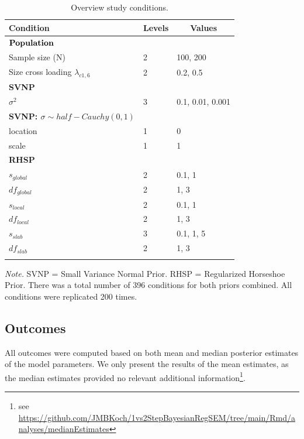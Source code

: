 \documentclass[
  man, donotrepeattitle,floatsintext]{apa6}
\begin{document}
\begin{table}[tbp]

\begin{center}
\begin{threeparttable}

\caption{\label{tab:unnamed-chunk-2}Overview study conditions.}

\begin{tabular}{lll}
\toprule
Condition & \multicolumn{1}{c}{Levels} & \multicolumn{1}{c}{Values}\\
\midrule
$\bf{Population}$ &  & \\
Sample size (N) & 2 & 100, 200\\
Size cross loading $\lambda_{c1 , 6}$ & 2 & 0.2, 0.5\\
\bf{SVNP} &  & \\
$\sigma^2$ & 3 & 0.1, 0.01, 0.001\\
\bf{SVNP}: $\sigma \sim half-Cauchy(0, 1)$ &  & \\
location & 1 & 0\\
scale & 1 & 1\\
\bf{RHSP} &  & \\
$s_{global}$ & 2 & 0.1, 1\\
$df_{global}$ & 2 & 1, 3\\
$s_{local}$ & 2 & 0.1, 1\\
$df_{local}$ & 2 & 1, 3\\
$s_{slab}$ & 3 & 0.1, 1, 5\\
$df_{slab}$ & 2 & 1, 3\\
\bottomrule
\addlinespace
\end{tabular}

\begin{tablenotes}[para]
\normalsize{\textit{Note.} SVNP = Small Variance Normal Prior. RHSP = Regularized Horseshoe Prior. There was a total number of 396 conditions for both priors combined.  All conditions were replicated 200 times.}
\end{tablenotes}

\end{threeparttable}
\end{center}

\end{table}

\subsection{Outcomes}\label{outcomes}

All outcomes were computed based on both mean and median posterior
estimates of the model parameters. We only present the results of the
mean estimates, as the median estimates provided no relevant additional
information\footnote{see
  \url{https://github.com/JMBKoch/1vs2StepBayesianRegSEM/tree/main/Rmd/analyses/medianEstimates}}.
\end{document}
